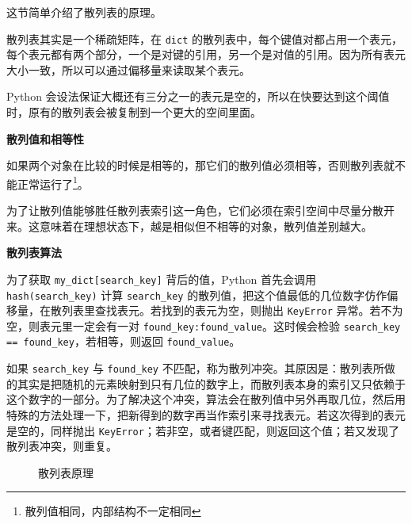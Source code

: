 这节简单介绍了散列表的原理。

散列表其实是一个稀疏矩阵，在 \texttt{dict} 的散列表中，每个键值对都占用一个表元，每个表元都有两个部分，一个是对键的引用，另一个是对值的引用。因为所有表元大小一致，所以可以通过偏移量来读取某个表元。

Python 会设法保证大概还有三分之一的表元是空的，所以在快要达到这个阈值时，原有的散列表会被复制到一个更大的空间里面。

\noindent\textbf{散列值和相等性}

如果两个对象在比较的时候是相等的，那它们的散列值必须相等，否则散列表就不能正常运行了\footnote{散列值相同，内部结构不一定相同}。

为了让散列值能够胜任散列表索引这一角色，它们必须在索引空间中尽量分散开来。这意味着在理想状态下，越是相似但不相等的对象，散列值差别越大。

\noindent\textbf{散列表算法}

为了获取 \texttt{my\_dict[search\_key]} 背后的值，Python 首先会调用 \texttt{hash(search\_key)} 计算 \texttt{search\_key} 的散列值，把这个值最低的几位数字仿作偏移量，在散列表里查找表元。若找到的表元为空，则抛出 \texttt{KeyError} 异常。若不为空，则表元里一定会有一对 \texttt{found\_key:found\_value}。这时候会检验 \texttt{search\_key == found\_key}，若相等，则返回 \texttt{found\_value}。

如果 \texttt{search\_key} 与 \texttt{found\_key} 不匹配，称为散列冲突。其原因是：散列表所做的其实是把随机的元素映射到只有几位的数字上，而散列表本身的索引又只依赖于这个数字的一部分。为了解决这个冲突，算法会在散列值中另外再取几位，然后用特殊的方法处理一下，把新得到的数字再当作索引来寻找表元。若这次得到的表元是空的，同样抛出 \texttt{KeyError}；若非空，或者键匹配，则返回这个值；若又发现了散列表冲突，则重复。

\begin{figure}[H]
    \centering
    \caption{散列表原理}
    \label{fig:散列表原理}
\end{figure}


